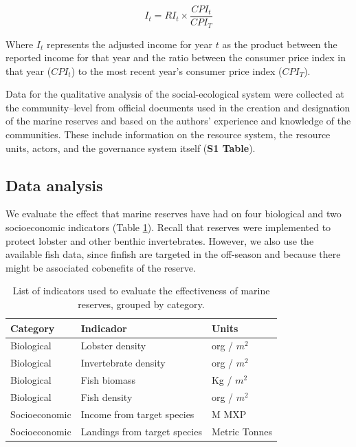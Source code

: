 \documentclass{frontiersSCNS}
\theoremstyle{definition}
\theoremstyle{definition}
\theoremstyle{definition}
\theoremstyle{remark}
\begin{document}
\begin{equation}
I_t = RI_t\times\frac{CPI_t}{CPI_T}
\label{eqn:cpi}
\end{equation}

Where \(I_t\) represents the adjusted income for year \(t\) as the
product between the reported income for that year and the ratio between
the consumer price index in that year (\(CPI_t\)) to the most recent
year's consumer price index (\(CPI_T\)).

Data for the qualitative analysis of the social-ecological system were
collected at the community--level from official documents used in the
creation and designation of the marine reserves
\citep{dof_website_2012,dof_website_2013} and based on the authors'
experience and knowledge of the communities. These include information
on the resource system, the resource units, actors, and the governance
system itself (\textbf{S1 Table}).

\subsection{Data analysis}\label{data-analysis}

We evaluate the effect that marine reserves have had on four biological
and two socioeconomic indicators (Table \ref{table:indicators}). Recall
that reserves were implemented to protect lobster and other benthic
invertebrates. However, we also use the available fish data, since
finfish are targeted in the off-season and because there might be
associated cobenefits of the reserve.

\begin{table}[H]

\caption{\label{tab:unnamed-chunk-3}\label{table:indicators}List of indicators used to evaluate the effectiveness of marine reserves, grouped by category.}
\centering
\begin{tabular}[t]{l|l|l}
\hline
Category & Indicador & Units\\
\hline
Biological & Lobster density & org / $m^2$\\
\hline
Biological & Invertebrate density & org / $m^2$\\
\hline
Biological & Fish biomass & Kg / $m^2$\\
\hline
Biological & Fish density & org / $m^2$\\
\hline
Socioeconomic & Income from target species & M MXP\\
\hline
Socioeconomic & Landings from target species & Metric Tonnes\\
\hline
\end{tabular}
\end{table}
\end{document}
